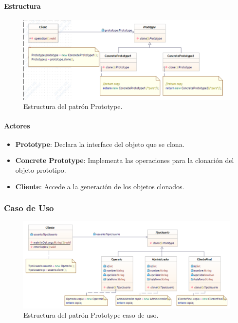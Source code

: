 \paragraph{Estructura}

\begin{figure}[th!]
	\centering
	\includegraphics[width=.7\linewidth]{imagenes/Patrones/Prototype.pdf}
	\caption{Estructura del patrón Prototype.\cite{gof}}	
\end{figure}

\paragraph{Actores}

\begin{itemize}
	\item \textbf{Prototype}: Declara la interface del objeto que se clona.
	\item \textbf{Concrete Prototype}: Implementa las operaciones para la clonación del objeto prototipo.
	\item \textbf{Cliente}: Accede a la generación de los objetos clonados.
\end{itemize}


\subsubsection{Caso de Uso}

\begin{figure}[th!]
	\centering
	\includegraphics[width=.7\linewidth]{imagenes/Patrones/Prototype_caso.pdf}
	\caption{Estructura del patrón Prototype caso de uso.\cite{gof}}	
\end{figure}



